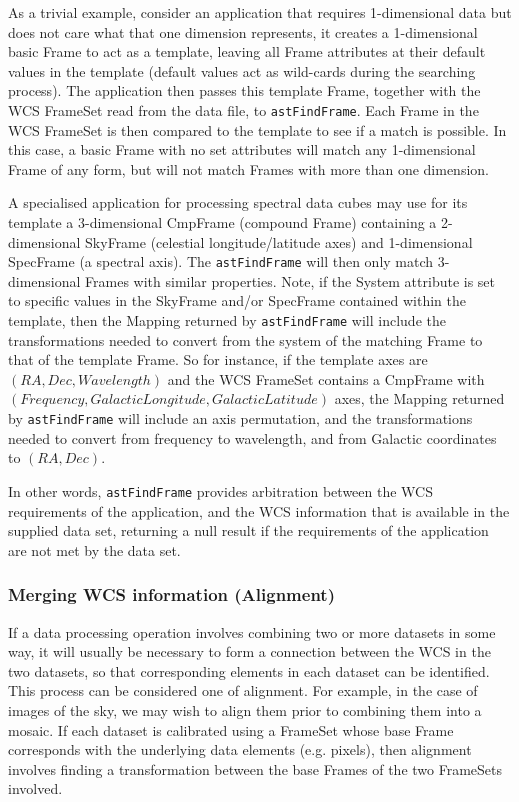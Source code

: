 \documentclass[final,authoryear,5p,times,twocolumn]{elsarticle}
\begin{document}
As a trivial example, consider an application that requires 1-dimensional
data but does not care what that one dimension represents, it creates a
1-dimensional basic Frame to act as a template, leaving all Frame
attributes at their default values in the template (default values act as
wild-cards during the searching process). The application then passes
this template Frame, together with the WCS FrameSet read from the data
file, to \texttt{astFindFrame}. Each Frame in the WCS FrameSet is then compared to
the template to see if a match is possible. In this case, a basic Frame
with no set attributes will match any 1-dimensional Frame of any form,
but will not match Frames with more than one dimension.

A specialised application for processing spectral data cubes may use for
its template a 3-dimensional CmpFrame (compound Frame) containing a
2-dimensional SkyFrame (celestial longitude/latitude axes) and
1-dimensional SpecFrame (a spectral axis). The \texttt{astFindFrame} will then
only match 3-dimensional Frames with similar properties. Note, if the
System attribute is set to specific values in the SkyFrame and/or
SpecFrame contained within the template, then the Mapping returned by
\texttt{astFindFrame} will include the transformations needed to convert from the
system of the matching Frame to that of the template Frame. So for
instance, if the template axes are $(RA,Dec,Wavelength)$ and the WCS
FrameSet contains a CmpFrame with $(Frequency,GalacticLongitude,
GalacticLatitude)$ axes, the Mapping returned by \texttt{astFindFrame} will include an
axis permutation, and the transformations needed to convert from frequency
to wavelength, and from Galactic coordinates to $(RA,Dec)$.

In other words, \texttt{astFindFrame} provides arbitration between the WCS
requirements of the application, and the WCS information that is available
in the supplied data set, returning a null result if the requirements of
the application are not met by the data set.

\subsubsection{Merging WCS information (Alignment)}
If a data processing operation involves combining two or more datasets in
some way, it will usually be necessary to form a connection between the
WCS in the two datasets, so that corresponding elements in each dataset
can be identified. This process can be considered one of alignment. For
example, in the case of images of the sky, we may wish to align them
prior to combining them into a mosaic. If each dataset is calibrated
using a FrameSet whose base Frame corresponds with the underlying data
elements (e.g. pixels), then alignment involves finding a transformation
between the base Frames of the two FrameSets involved.
\end{document}
